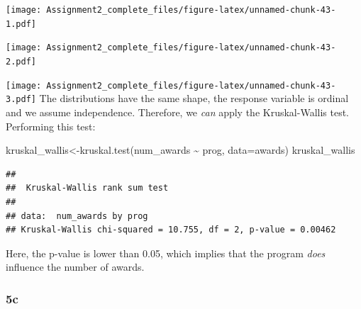 \documentclass[
]{article}
\newenvironment{Shaded}{\begin{snugshade}}{\end{snugshade}}
\newcommand{\AttributeTok}[1]{\textcolor[rgb]{0.77,0.63,0.00}{#1}}
\newcommand{\DecValTok}[1]{\textcolor[rgb]{0.00,0.00,0.81}{#1}}
\newcommand{\FunctionTok}[1]{\textcolor[rgb]{0.00,0.00,0.00}{#1}}
\newcommand{\NormalTok}[1]{#1}
\newcommand{\OtherTok}[1]{\textcolor[rgb]{0.56,0.35,0.01}{#1}}
\newcommand{\SpecialCharTok}[1]{\textcolor[rgb]{0.00,0.00,0.00}{#1}}
\begin{document}
\texttt{[image: Assignment2\_complete\_files/figure-latex/unnamed-chunk-43-1.pdf]}

\begin{Shaded}
\end{Shaded}

\texttt{[image: Assignment2\_complete\_files/figure-latex/unnamed-chunk-43-2.pdf]}

\begin{Shaded}
\end{Shaded}

\texttt{[image: Assignment2\_complete\_files/figure-latex/unnamed-chunk-43-3.pdf]}
The distributions have the same shape, the response variable is ordinal
and we assume independence. Therefore, we \emph{can} apply the
Kruskal-Wallis test. Performing this test:

\begin{Shaded}
\begin{Highlighting}[]
\NormalTok{kruskal\_wallis}\OtherTok{\textless{}{-}}\FunctionTok{kruskal.test}\NormalTok{(num\_awards }\SpecialCharTok{\textasciitilde{}}\NormalTok{ prog, }\AttributeTok{data=}\NormalTok{awards)}
\NormalTok{kruskal\_wallis}
\end{Highlighting}
\end{Shaded}

\begin{verbatim}
## 
##  Kruskal-Wallis rank sum test
## 
## data:  num_awards by prog
## Kruskal-Wallis chi-squared = 10.755, df = 2, p-value = 0.00462
\end{verbatim}

Here, the p-value is lower than 0.05, which implies that the program
\emph{does} influence the number of awards.

\hypertarget{c-1}{%
\subsubsection{5c}\label{c-1}}
\end{document}

